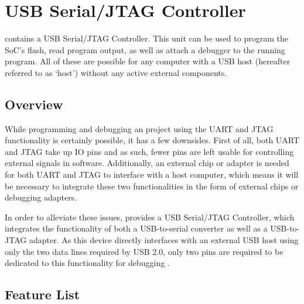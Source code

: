 \documentclass[main\_\_EN.tex]{subfiles}
\begin{document}

\ifglobal
\else
    \listoftodos
    {\let\clearpage\relax \listofdonetodos}
    \tableofcontents
\fi










\hypertarget{usbserialjtag}{}
\chapter{USB Serial/JTAG Controller}
\label{mod:usbserialjtag}


\chipname{} contains a USB Serial/JTAG Controller. This unit can be used to program the SoC's flash, read program output, as well as attach a debugger to the running program. All of these are possible for any computer with a USB host (hereafter referred to as `host') without any active external components.

\section{Overview}

While programming and debugging an \chipname{} project using the UART and JTAG functionality is certainly possible, it has a few downsides. First of all, both UART and JTAG take up IO pins and as such, fewer pins are left usable for controlling external signals in software. Additionally, an external chip or adapter is needed for both UART and JTAG to interface with a host computer, which means it will be necessary to integrate these two functionalities in the form of external chips or debugging adapters.

In order to alleviate these issues, \chipname{} provides a USB Serial/JTAG Controller, which integrates the functionality of both a USB-to-serial converter as well as a USB-to-JTAG adapter. As this device directly interfaces with an external USB host using only the two data lines required by USB 2.0, only two pins are required to be dedicated to this functionality for debugging \chipname{}.

\section{Feature List}
\label{sec:usbserialjtag-features}
\end{document}
